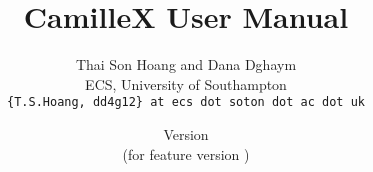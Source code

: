 \documentclass[a4paper,10pt]{article}
\title{CamilleX User Manual}
\author{%
  Thai Son Hoang and Dana Dghaym\\%
  ECS, University of Southampton\\%
  \texttt{\{T.S.Hoang, dd4g12\} at ecs dot soton dot ac dot uk}%
}%
\date{%
  Version \CamilleXManualVersion\\%
  (for feature version \CamilleXFeatureVersion)\\
  \ifplastex
  \CamilleXManualDate
  \else
  \displaydate{CamilleXManualDate}%
  \fi
}
\begin{document}
\ifplastex%
\maketitle%
\else%
 \ifstandalone%
 \maketitle %
 \else%
 \fi%
\fi%











%




\end{document}
